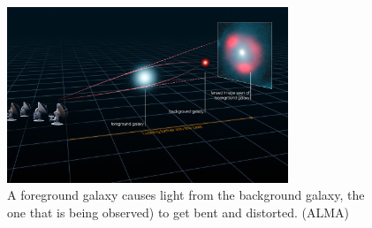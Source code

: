 \documentclass[14pt]{article}
\begin{document}
\begin{figure}[h]
    \centering
    \includegraphics[width=0.75\textwidth]{lensing.jpeg}
    \caption{A foreground galaxy causes light from the background galaxy, the one that is being observed) to get bent and distorted. (ALMA)}
    \label{fig:lensing}
\end{figure}
\end{document}
